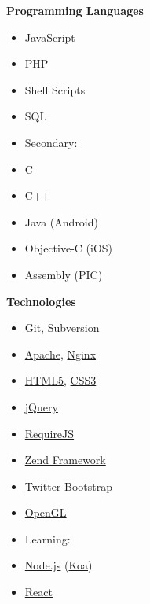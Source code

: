 \noindent
\begin{minipage}[t]{.3\linewidth}
\vspace{0pt}
\textbf{Programming Languages}
\begin{itemize}[itemsep=0pt]    %
    \item JavaScript
    \item PHP
    \item Shell Scripts
    \item SQL
    \item[] \hspace*{-2em} Secondary:
    \item C
    \item C++
    \item Java (Android)
    \item Objective-C (iOS)
    \item Assembly (PIC)
\end{itemize}
\end{minipage}
%
\hfill
%
\begin{minipage}[t]{.25\linewidth}
\vspace{0pt}
\textbf{Technologies}
\begin{itemize}[itemsep=0pt]
    \item \href{http://git-scm.com}{Git}, \href{http://subversion.apache.org}{Subversion}
    \item \href{http://httpd.apache.org}{Apache}, \href{http://nginx.com}{Nginx}
    \item \href{http://dev.w3.org/html5/html-author}{HTML5}, \href{http://w3.org/Style/CSS}{CSS3}
    \item \href{http://jquery.com}{jQuery}
    \item \href{http://requirejs.org}{RequireJS}
    \item \href{http://framework.zend.com}{Zend Framework}
    \item \href{http://getbootstrap.com}{Twitter Bootstrap}
    \item \href{http://opengl.org}{OpenGL}
    \item[] \hspace*{-2em} Learning:
    \item \href{http://nodejs.org}{Node.js} (\href{http://koajs.com}{Koa})
    \item \href{http://facebook.github.io/react}{React}
\end{itemize}
\end{minipage}
